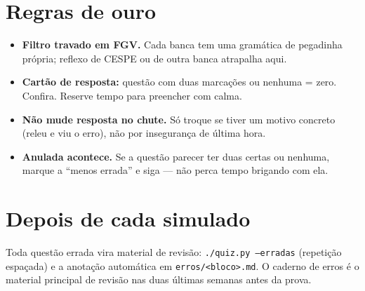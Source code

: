 \section{Regras de ouro}

\begin{itemize}
\item \textbf{Filtro travado em FGV.} Cada banca tem uma gramática de
pegadinha própria; reflexo de CESPE ou de outra banca atrapalha aqui.
\item \textbf{Cartão de resposta:} questão com duas marcações ou nenhuma =
zero. Confira. Reserve tempo para preencher com calma.
\item \textbf{Não mude resposta no chute.} Só troque se tiver um motivo
concreto (releu e viu o erro), não por insegurança de última hora.
\item \textbf{Anulada acontece.} Se a questão parecer ter duas certas ou
nenhuma, marque a ``menos errada'' e siga --- não perca tempo brigando com
ela.
\end{itemize}

\section{Depois de cada simulado}

Toda questão errada vira material de revisão: \texttt{./quiz.py --erradas}
(repetição espaçada) e a anotação automática em \texttt{erros/<bloco>.md}. O
caderno de erros é o material principal de revisão nas duas últimas semanas
antes da prova.
